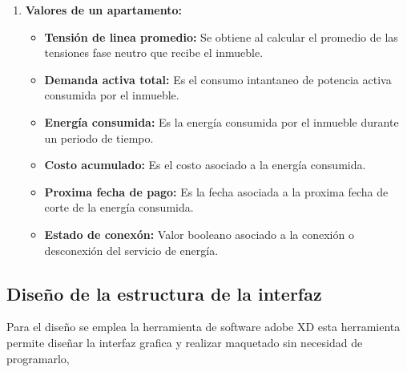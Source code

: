 \begin{enumerate}
        \item \textbf{Valores de un apartamento:}
        
        \begin{itemize}
            \item \textbf{Tensión de linea promedio:} Se obtiene al calcular el promedio de las tensiones fase neutro que recibe el inmueble.
            \item \textbf{Demanda activa total:} Es el consumo intantaneo de potencia activa consumida por el inmueble.
            \item \textbf{Energía consumida:} Es la energía consumida por el inmueble durante un periodo de tiempo.
            \item \textbf{Costo acumulado:} Es el costo asociado a la energía consumida.
            \item \textbf{Proxima fecha de pago:} Es la fecha asociada a la proxima fecha de corte de la energía consumida.
            \item \textbf{Estado de conexón:} Valor booleano asociado a la conexión o desconexión del servicio de energía.
        \end{itemize}
    \end{enumerate}
\subsection{Diseño de la estructura de la interfaz}
    Para el diseño se emplea la herramienta de software adobe XD esta herramienta permite diseñar la interfaz grafica y realizar
    maquetado sin necesidad de programarlo, 
\newpage